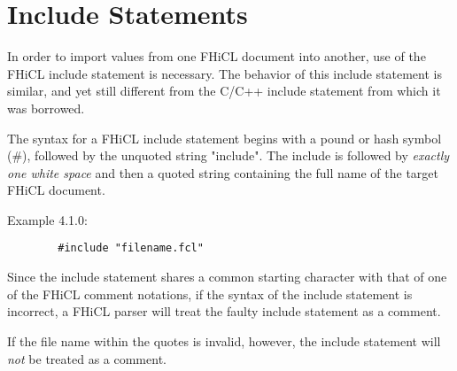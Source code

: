 \documentclass{memarticle}
\begin{document}
\chapter{Include Statements}
	In order to import values from one FHiCL document into another,
	use of the FHiCL include statement is necessary.
	The behavior of this include statement is similar,
	and yet still different from the C/C++ include statement from which it was borrowed.
	\par
	The syntax for a FHiCL include statement begins with a pound or hash symbol (\#),
	followed by the unquoted string "include".
	The include is followed by \emph{exactly one white space}
	and then a quoted string containing the full name of the target FHiCL document.
	\par
	Example 4.1.0:
	\begin{verbatim}
		#include "filename.fcl"
	\end{verbatim}	
	\par
	Since the include statement shares a common starting character with that of one of the FHiCL comment notations,
	if the syntax of the include statement is incorrect,
	a FHiCL parser will treat the faulty include statement as a comment.
	\par
	If the file name within the quotes is invalid, however, the include statement will \emph{not} be treated as a comment.
\end{document}
